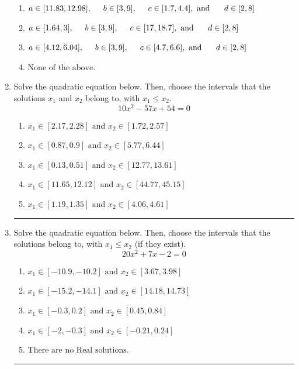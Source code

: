 \documentclass[14pt]{extbook}
\newcommand{\litem}[1]{\item#1\hspace*{-1cm}\rule{\textwidth}{0.4pt}}
\begin{document}
\begin{enumerate}
{\begin{enumerate}[label=\Alph*.]
\item \( a \in [11.83, 12.98], \hspace*{5mm} b \in [3, 9], \hspace*{5mm} c \in [1.7, 4.4], \text{ and } \hspace*{5mm} d \in [2, 8] \)
\item \( a \in [1.64, 3], \hspace*{5mm} b \in [3, 9], \hspace*{5mm} c \in [17, 18.7], \text{ and } \hspace*{5mm} d \in [2, 8] \)
\item \( a \in [4.12, 6.04], \hspace*{5mm} b \in [3, 9], \hspace*{5mm} c \in [4.7, 6.6], \text{ and } \hspace*{5mm} d \in [2, 8] \)
\item \( \text{None of the above.} \)

\end{enumerate} }
\litem{
Solve the quadratic equation below. Then, choose the intervals that the solutions $x_1$ and $x_2$ belong to, with $x_1 \leq x_2$.\[ 10x^{2} -57 x + 54 = 0 \]\begin{enumerate}[label=\Alph*.]
\item \( x_1 \in [2.17, 2.28] \text{ and } x_2 \in [1.72, 2.57] \)
\item \( x_1 \in [0.87, 0.9] \text{ and } x_2 \in [5.77, 6.44] \)
\item \( x_1 \in [0.13, 0.51] \text{ and } x_2 \in [12.77, 13.61] \)
\item \( x_1 \in [11.65, 12.12] \text{ and } x_2 \in [44.77, 45.15] \)
\item \( x_1 \in [1.19, 1.35] \text{ and } x_2 \in [4.06, 4.61] \)

\end{enumerate} }
\litem{
Solve the quadratic equation below. Then, choose the intervals that the solutions belong to, with $x_1 \leq x_2$ (if they exist).\[ 20x^{2} +7 x -2 = 0 \]\begin{enumerate}[label=\Alph*.]
\item \( x_1 \in [-10.9, -10.2] \text{ and } x_2 \in [3.67, 3.98] \)
\item \( x_1 \in [-15.2, -14.1] \text{ and } x_2 \in [14.18, 14.73] \)
\item \( x_1 \in [-0.3, 0.2] \text{ and } x_2 \in [0.45, 0.84] \)
\item \( x_1 \in [-2, -0.3] \text{ and } x_2 \in [-0.21, 0.24] \)
\item \( \text{There are no Real solutions.} \)


\end{enumerate}}
\end{enumerate}
\end{document}
